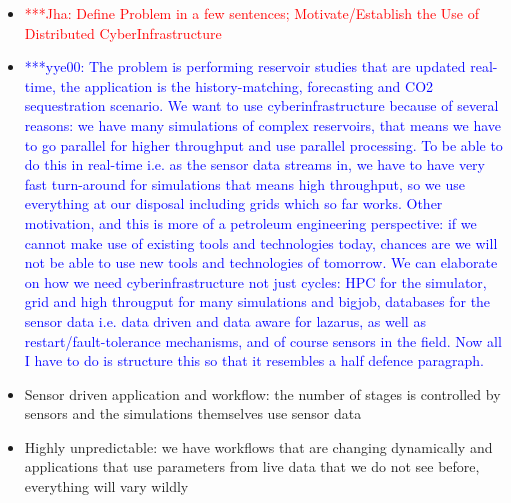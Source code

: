 \documentclass[conference,final]{IEEEtran}
\newcommand{\jhanote}[1]{ {\textcolor{red} { ***Jha: #1 }}}
\newcommand{\yyenote}[1]{ {\textcolor{blue} { ***yye00: #1 }}}
\newcommand{\jhanote}[1]{}
\newcommand{\yyenote}[1]{}
\begin{document}
\begin{itemize}
\item \jhanote{Define Problem in a few sentences; Motivate/Establish the Use of Distributed CyberInfrastructure}
\item \yyenote{ The problem is performing reservoir studies that are updated real-time, the application is the history-matching, forecasting and CO2 sequestration scenario. We want to use cyberinfrastructure because of several reasons: we have many simulations of complex reservoirs, that means we have to go parallel for higher throughput and use parallel processing. To be able to do this in real-time i.e. as the sensor data streams in, we have to have very fast turn-around for simulations that means high throughput, so we use everything at our disposal including grids which so far works. Other motivation, and this is more of a petroleum engineering perspective: if we cannot make use of existing tools and technologies today, chances are we will not be able to use new tools and technologies of tomorrow. We can elaborate on how we need cyberinfrastructure not just cycles: HPC for the simulator, grid and high througput for many simulations and bigjob, databases for the sensor data i.e. data driven and data aware for lazarus, as well as restart/fault-tolerance mechanisms, and of course sensors in the field. Now all I have to do is structure this so that it resembles a half defence paragraph. }
 \item Sensor driven application and workflow: the number of stages is controlled by sensors and the simulations themselves use sensor data
 \item Highly unpredictable: we have workflows that are changing dynamically and applications that use parameters from live data that we do not see before, everything will vary wildly


\end{itemize}
\end{document}
